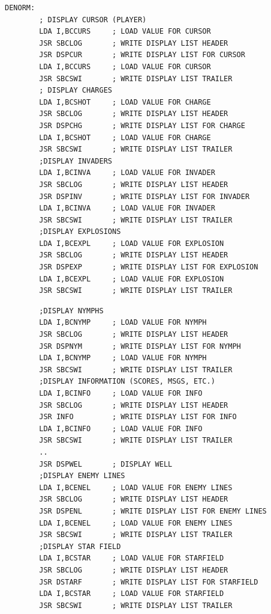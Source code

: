 \begin{lstlisting}
DENORM:
        ; DISPLAY CURSOR (PLAYER)
        LDA I,BCCURS     ; LOAD VALUE FOR CURSOR
        JSR SBCLOG       ; WRITE DISPLAY LIST HEADER
        JSR DSPCUR       ; WRITE DISPLAY LIST FOR CURSOR
        LDA I,BCCURS     ; LOAD VALUE FOR CURSOR
        JSR SBCSWI       ; WRITE DISPLAY LIST TRAILER
        ; DISPLAY CHARGES
        LDA I,BCSHOT     ; LOAD VALUE FOR CHARGE
        JSR SBCLOG       ; WRITE DISPLAY LIST HEADER
        JSR DSPCHG       ; WRITE DISPLAY LIST FOR CHARGE
        LDA I,BCSHOT     ; LOAD VALUE FOR CHARGE
        JSR SBCSWI       ; WRITE DISPLAY LIST TRAILER
        ;DISPLAY INVADERS
        LDA I,BCINVA     ; LOAD VALUE FOR INVADER
        JSR SBCLOG       ; WRITE DISPLAY LIST HEADER
        JSR DSPINV       ; WRITE DISPLAY LIST FOR INVADER
        LDA I,BCINVA     ; LOAD VALUE FOR INVADER
        JSR SBCSWI       ; WRITE DISPLAY LIST TRAILER
        ;DISPLAY EXPLOSIONS
        LDA I,BCEXPL     ; LOAD VALUE FOR EXPLOSION
        JSR SBCLOG       ; WRITE DISPLAY LIST HEADER
        JSR DSPEXP       ; WRITE DISPLAY LIST FOR EXPLOSION
        LDA I,BCEXPL     ; LOAD VALUE FOR EXPLOSION
        JSR SBCSWI       ; WRITE DISPLAY LIST TRAILER
\end{lstlisting}
\begin{lstlisting}
        ;DISPLAY NYMPHS
        LDA I,BCNYMP     ; LOAD VALUE FOR NYMPH
        JSR SBCLOG       ; WRITE DISPLAY LIST HEADER
        JSR DSPNYM       ; WRITE DISPLAY LIST FOR NYMPH
        LDA I,BCNYMP     ; LOAD VALUE FOR NYMPH
        JSR SBCSWI       ; WRITE DISPLAY LIST TRAILER
        ;DISPLAY INFORMATION (SCORES, MSGS, ETC.)
        LDA I,BCINFO     ; LOAD VALUE FOR INFO
        JSR SBCLOG       ; WRITE DISPLAY LIST HEADER
        JSR INFO         ; WRITE DISPLAY LIST FOR INFO
        LDA I,BCINFO     ; LOAD VALUE FOR INFO
        JSR SBCSWI       ; WRITE DISPLAY LIST TRAILER
        ..
        JSR DSPWEL       ; DISPLAY WELL
        ;DISPLAY ENEMY LINES
        LDA I,BCENEL     ; LOAD VALUE FOR ENEMY LINES
        JSR SBCLOG       ; WRITE DISPLAY LIST HEADER
        JSR DSPENL       ; WRITE DISPLAY LIST FOR ENEMY LINES
        LDA I,BCENEL     ; LOAD VALUE FOR ENEMY LINES
        JSR SBCSWI       ; WRITE DISPLAY LIST TRAILER
        ;DISPLAY STAR FIELD
        LDA I,BCSTAR     ; LOAD VALUE FOR STARFIELD
        JSR SBCLOG       ; WRITE DISPLAY LIST HEADER
        JSR DSTARF       ; WRITE DISPLAY LIST FOR STARFIELD
        LDA I,BCSTAR     ; LOAD VALUE FOR STARFIELD
        JSR SBCSWI       ; WRITE DISPLAY LIST TRAILER
\end{lstlisting}
